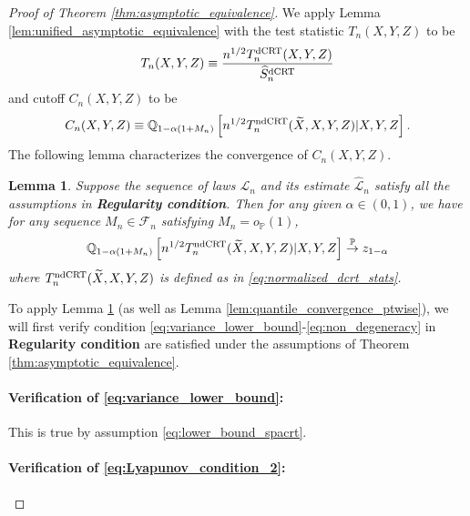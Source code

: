 \documentclass[12pt]{article}
\newtheorem{lemma}{Lemma}
\theoremstyle{definition}
\def\P{\mathbb{P}}
\def\P{\mathbb{P}}
\renewcommand{\P}{\mathbb{P}}							%
\newcommand{\Q}{\mathbb{Q}}								%
\newcommand{\convp}{\overset{\mathbb{P}}{\rightarrow}}             %
\newcommand{\srx}{X}									%
\newcommand{\srz}{Z}									%
\newcommand{\srxk}{\widetilde X}						%
\newcommand{\sry}{Y}									%
\newcommand{\law}{\mathcal L}							%
\newcommand{\lawhat}{\widehat{\mathcal L}}				%
\newcommand{\dCRT}{\textnormal{dCRT}} 					%
\newcommand{\ndCRThat}{\textnormal{ndCRT}}	%
\begin{document}
\begin{proof}[Proof of Theorem \ref{thm:asymptotic_equivalence}]
	We apply Lemma \ref{lem:unified_asymptotic_equivalence} with the test statistic $T_n(\srx,\sry,\srz)$ to be
	\begin{align*}
		T_n(\srx,\sry,\srz)\equiv\frac{n^{1/2}T_n^{\dCRT}(\srx,\sry,\srz)}{\widehat{S}_n^{\dCRT}}
	\end{align*}
	and cutoff $C_n(\srx,\sry,\srz)$ to be 
	\begin{align*}
	  C_n(\srx,\sry,\srz)\equiv\Q_{1-\alpha(1+M_n)}\left[n^{1/2}T_n^{\ndCRThat}(\srxk, \srx, \sry,\srz)|\srx,\sry,\srz\right].
	\end{align*}
	The following lemma characterizes the convergence of $C_n(X,Y,Z)$.
	\begin{lemma}\label{lem:quantile_equivalence}
	  Suppose the sequence of laws $\law_n$ and its estimate $\lawhat_n$ satisfy all the assumptions in \textbf{Regularity condition}. Then for any given $\alpha\in (0,1)$, we have for any sequence $M_n\in\mathcal{F}_n$ satisfying $M_n=o_\P(1)$,
	  \begin{align*}
		\Q_{1-\alpha(1+M_n)}\left[n^{1/2}T_n^{\ndCRThat}(\srxk, \srx, \sry,\srz)|\srx,\sry,\srz\right]\convp z_{1-\alpha}
	  \end{align*}
	  where $T_n^{\ndCRThat}(\srxk,\srx,\sry,\srz)$ is defined as in \eqref{eq:normalized_dcrt_stats}.
	\end{lemma}
  \noindent To apply Lemma \ref{lem:quantile_equivalence} (as well as Lemma \ref{lem:quantile_convergence_ptwise}), we will first verify condition \eqref{eq:variance_lower_bound}-\eqref{eq:non_degeneracy} in \textbf{Regularity condition} are satisfied under the assumptions of Theorem \ref{thm:asymptotic_equivalence}.

  \paragraph{Verification of \eqref{eq:variance_lower_bound}:}

  This is true by assumption \eqref{eq:lower_bound_spacrt}.

  \paragraph{Verification of \eqref{eq:Lyapunov_condition_2}:}


\end{proof}
\end{document}
